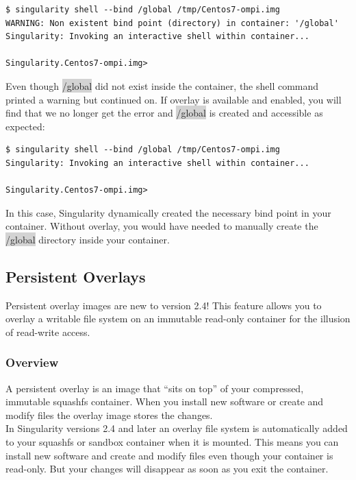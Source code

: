 \documentclass[a4paper]{article}
\begin{document}
\begin{lstlisting}[frame=single] 
$ singularity shell --bind /global /tmp/Centos7-ompi.img
WARNING: Non existent bind point (directory) in container: '/global'
Singularity: Invoking an interactive shell within container...

Singularity.Centos7-ompi.img>
\end{lstlisting}		
		
		
Even though \colorbox{lightgray}{/global} did not exist inside the container, the shell command printed a warning but continued on. If overlay is available and enabled, you will find that we no longer get the error and \colorbox{lightgray}{/global} is created and accessible as expected:

\begin{lstlisting}[frame=single]  
$ singularity shell --bind /global /tmp/Centos7-ompi.img
Singularity: Invoking an interactive shell within container...

Singularity.Centos7-ompi.img>
\end{lstlisting}

In this case, Singularity dynamically created the necessary bind point in your container. Without overlay, you would have needed to manually create the \colorbox{lightgray}{/global} directory inside your container.

\subsection{Persistent Overlays}

Persistent overlay images are new to version 2.4! This feature allows you to overlay a writable file system on an immutable read-only container for the illusion of read-write access.

\subsubsection{Overview}
A persistent overlay is an image that “sits on top” of your compressed, immutable squashfs container. When you install new software or create and modify files the overlay image stores the changes.\\[0.1in]

In Singularity versions 2.4 and later an overlay file system is automatically added to your squashfs or sandbox container when it is mounted. This means you can install new software and create and modify files even though your container is read-only. But your changes will disappear as soon as you exit the container.\\[0.1in]
\end{document}

